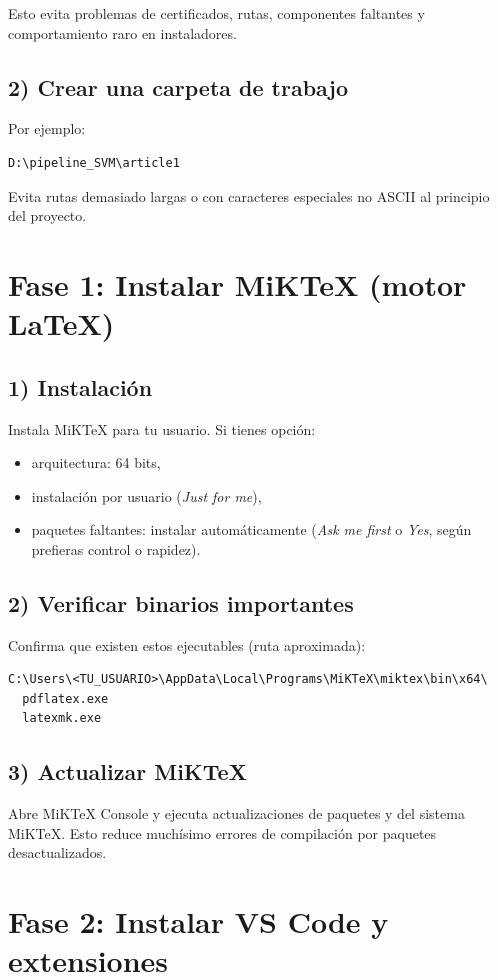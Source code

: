 \documentclass[11pt]{article}
\begin{document}
Esto evita problemas de certificados, rutas, componentes faltantes y comportamiento raro en instaladores.

\subsection{2) Crear una carpeta de trabajo}
Por ejemplo:
\begin{verbatim}
D:\pipeline_SVM\article1
\end{verbatim}

Evita rutas demasiado largas o con caracteres especiales no ASCII al principio del proyecto.

\section{Fase 1: Instalar MiKTeX (motor LaTeX)}
\subsection{1) Instalaci\'on}
Instala MiKTeX para tu usuario. Si tienes opci\'on:
\begin{itemize}
  \item arquitectura: 64 bits,
  \item instalaci\'on por usuario (\textit{Just for me}),
  \item paquetes faltantes: instalar autom\'aticamente (\textit{Ask me first} o \textit{Yes}, seg\'un prefieras control o rapidez).
\end{itemize}

\subsection{2) Verificar binarios importantes}
Confirma que existen estos ejecutables (ruta aproximada):
\begin{verbatim}
C:\Users\<TU_USUARIO>\AppData\Local\Programs\MiKTeX\miktex\bin\x64\
  pdflatex.exe
  latexmk.exe
\end{verbatim}

\subsection{3) Actualizar MiKTeX}
Abre MiKTeX Console y ejecuta actualizaciones de paquetes y del sistema MiKTeX. Esto reduce much\'isimo errores de compilaci\'on por paquetes desactualizados.

\section{Fase 2: Instalar VS Code y extensiones}
\end{document}
